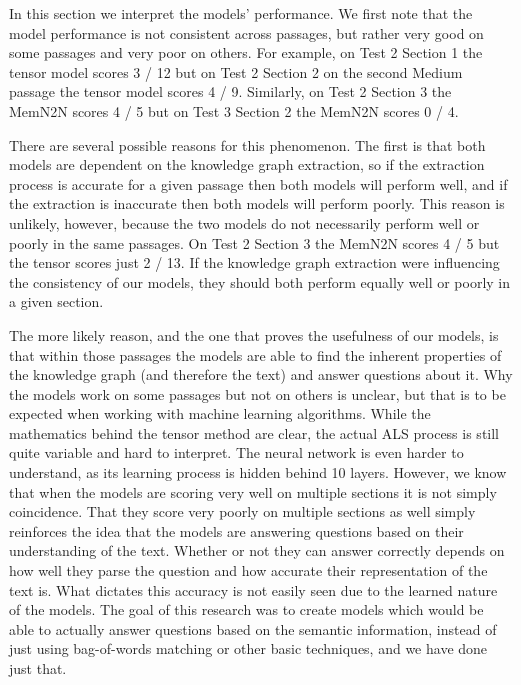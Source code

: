 \documentclass[pageno]{final_paper}
\begin{document}
In this section we interpret the models' performance. We first note that the
model performance is not consistent across passages, but rather very good on
some passages and very poor on others. For example, on Test 2 Section 1 the
tensor model scores 3 / 12 but on Test 2 Section 2 on the second Medium passage
the tensor model scores 4 / 9. Similarly, on Test 2 Section 3 the MemN2N scores
4 / 5 but on Test 3 Section 2 the MemN2N scores 0 / 4.

There are several possible reasons for this phenomenon. The first is that both
models are dependent on the knowledge graph extraction, so if the extraction
process is accurate for a given passage then both models will perform well, and
if the extraction is inaccurate then both models will perform poorly. This
reason is unlikely, however, because the two models do not necessarily perform
well or poorly in the same passages. On Test 2 Section 3 the MemN2N scores 4 / 5
but the tensor scores just 2 / 13. If the knowledge graph extraction were
influencing the consistency of our models, they should both perform equally well
or poorly in a given section.

The more likely reason, and the one that proves the usefulness of our models, is
that within those passages the models are able to find the inherent properties
of the knowledge graph (and therefore the text) and answer questions about it.
Why the models work on some passages but not on others is unclear, but that is
to be expected when working with machine learning algorithms. While the
mathematics behind the tensor method are clear, the actual ALS process is still
quite variable and hard to interpret. The neural network is even harder to
understand, as its learning process is hidden behind 10 layers. However, we know
that when the models are scoring very well on multiple sections it is not simply
coincidence. That they score very poorly on multiple sections as well simply
reinforces the idea that the models are answering questions based on their
understanding of the text. Whether or not they can answer correctly depends on
how well they parse the question and how accurate their representation of the
text is. What dictates this accuracy is not easily seen due to the learned
nature of the models. The goal of this research was to create models which would
be able to actually answer questions based on the semantic information, instead
of just using bag-of-words matching or other basic techniques, and we have done
just that.
\end{document}

